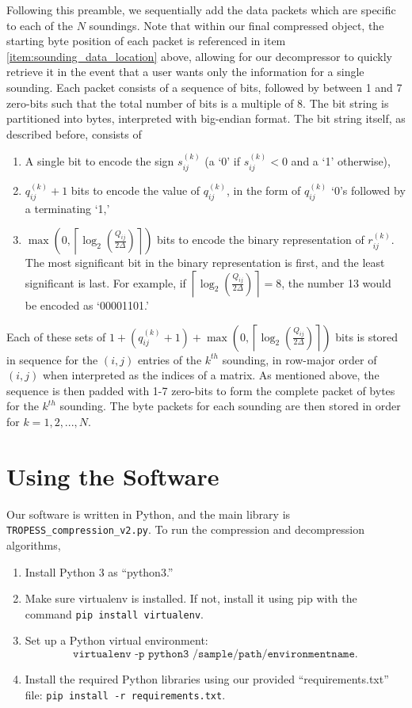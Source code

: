 \documentclass{article}
\begin{document}
Following this preamble, we sequentially add the data packets which are specific to each of the $N$ soundings. Note that within our final compressed object, the starting byte position of each packet is referenced in item \ref{item:sounding_data_location} above, allowing for our decompressor to quickly retrieve it in the event that a user wants only the information for a single sounding. Each packet consists of a sequence of bits, followed by between 1 and 7 zero-bits such that the total number of bits is a multiple of 8. The bit string is partitioned into bytes, interpreted with big-endian format. The bit string itself, as described before, consists of 
\begin{enumerate}
\item A single bit to encode the sign $s_{ij}^{(k)}$ (a `0' if $s_{ij}^{(k)} < 0$ and a `1' otherwise), 
\item $q_{ij}^{(k)} + 1$ bits to encode the value of $q_{ij}^{(k)}$, in the form of $q_{ij}^{(k)}$ `0's followed by a terminating `1,' 
\item $\max \left( 0, \left \lceil \log_2\left( \frac{Q_{ij}}{2 \Delta} \right) \right \rceil \right)$ bits to encode the binary representation of $r^{(k)}_{ij}$. The most significant bit in the binary representation is first, and the least significant is last. For example, if $\left \lceil  \log_2 \left( \frac{Q_{ij}}{2 \Delta} \right) \right \rceil = 8$, the number 13 would be encoded as `00001101.' 
\end{enumerate}
Each of these sets of $1 + (q_{ij}^{(k)} + 1) + \max \left( 0, \left \lceil \log_2\left( \frac{Q_{ij}}{2 \Delta} \right) \right \rceil \right)$ bits is stored in sequence for the $(i,j)$ entries of the $k^{th}$ sounding, in row-major order of $(i, j)$ when interpreted as the indices of a matrix. As mentioned above, the sequence is then padded with 1-7 zero-bits to form the complete packet of bytes for the $k^{th}$ sounding. The byte packets for each sounding are then stored in order for $k = 1, 2, ..., N$. 


\section{Using the Software} 
\label{sec:usingsoftware}

Our software is written in Python, and the main library is \texttt{TROPESS\_compression\_v2.py}. To run the compression and decompression algorithms, 
\begin{enumerate}
\item Install Python 3 as ``python3.''
\item Make sure virtualenv is installed. If not, install it using pip with the command \texttt{pip install virtualenv}. 
\item Set up a Python virtual environment: $$\texttt{virtualenv -p python3 /sample/path/environmentname}.$$ 
\item Install the required Python libraries using our provided ``requirements.txt'' file:  \texttt{pip install -r requirements.txt}. 
\end{enumerate} 
\end{document}
